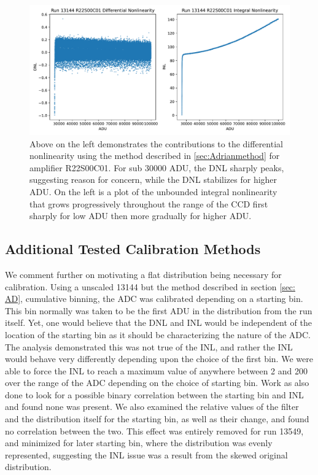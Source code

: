 \documentclass[11pt, letterpaper]{article}
\begin{document}
\begin{figure}
    \centering
    \includegraphics[width=0.5\linewidth]{inldnl.pdf}
    \caption{Above on the left demonstrates the contributions to the differential nonlinearity using the method described in \ref{sec:Adrianmethod} for amplifier R22S00C01. For sub 30000 ADU, the DNL sharply peaks, suggesting reason for concern, while the DNL stabilizes for higher ADU. On the left is a plot of the unbounded integral nonlinearity that grows progressively throughout the range of the CCD first sharply for low ADU then more gradually for higher ADU.}
    \label{fig:originalDNLINL}
\end{figure}

\subsection{Additional Tested Calibration Methods}
\label{sec:AdMethod}
We comment further on motivating a flat distribution being necessary for calibration.
Using a unscaled 13144 but the method described in section \ref{sec: AD}, cumulative binning, the ADC was calibrated depending on a starting bin.
This bin normally was taken to be the first ADU in the distribution from the run itself. 
Yet, one would believe that the DNL and INL would be independent of the location of the starting bin as it should be characterizing the nature of the ADC.
The analysis demonstrated this was not true of the INL, and rather the INL would behave very differently depending upon the choice of the first bin. 
We were able to force the INL to reach a maximum value of anywhere between 2 and 200 over the range of the ADC depending on the choice of starting bin.
Work as also done to look for a possible binary correlation between the starting bin and INL and found none was present. 
We also examined the relative values of the filter and the distribution itself for the starting bin, as well as their change, and found no correlation between the two. 
This effect was entirely removed for run 13549, and minimized for later starting bin, where the distribution was evenly represented, suggesting the INL issue was a result from the skewed original distribution. 
 \indent 
 
\end{document}
